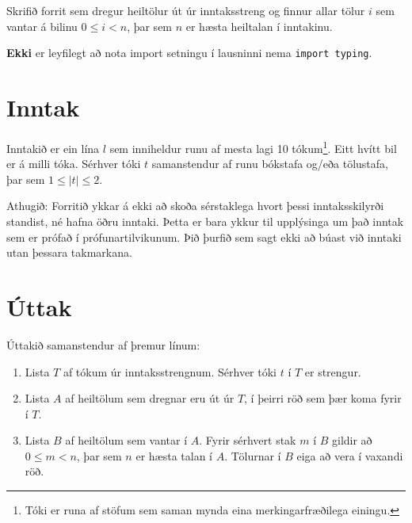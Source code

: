 
Skrifið forrit sem dregur heiltölur út úr inntaksstreng og finnur allar tölur $i$ sem vantar á bilinu $0 \le i < n$, þar sem $n$ er hæsta heiltalan í inntakinu.

\textbf{Ekki} er leyfilegt að nota import setningu í lausninni nema \texttt{import typing}.

\section*{Inntak}
Inntakið er ein lína $l$ sem inniheldur runu af mesta lagi 10 tókum\footnote{Tóki er runa af stöfum sem saman mynda eina merkingarfræðilega einingu.}. Eitt hvítt bil er á milli tóka.    
Sérhver tóki $t$ samanstendur af runu bókstafa og/eða tölustafa, þar sem $1 \le |t| \le 2$.

Athugið: Forritið ykkar á ekki að skoða sérstaklega hvort þessi inntaksskilyrði standist, né hafna öðru inntaki. 
Þetta er bara ykkur til upplýsinga um það inntak sem er prófað í prófunartilvikunum. 
Þið þurfið sem sagt ekki að búast við inntaki utan þessara takmarkana.

\section*{Úttak}
Úttakið samanstendur af þremur línum:
\begin{enumerate}
    \item Lista $T$ af tókum úr inntaksstrengnum. Sérhver tóki $t$ í $T$ er strengur.
    \item Lista $A$ af heiltölum sem dregnar eru út úr $T$,
    í þeirri röð sem þær koma fyrir í $T$.
    \item Lista $B$ af heiltölum sem vantar í $A$.
    Fyrir sérhvert stak $m$ í $B$ gildir að $0 \le m < n$, þar sem $n$ er hæsta talan í $A$.
    Tölurnar í $B$ eiga að vera í vaxandi röð.
\end{enumerate}
